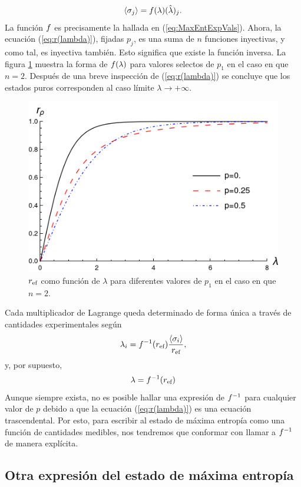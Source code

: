 \begin{equation}
    \expval{\sigma_{j}}=f(\lambda)(\hat{\lambda})_{j}.
\end{equation}
La función $f$ es precisamente la hallada en (\ref{eq:MaxEntExpVals}). Ahora, la ecuación (\ref{eq:r(lambda)}), fijadas $p_{j}$, es una suma de $n$ funciones inyectivas, y como tal, es inyectiva también. Esto significa que existe la función inversa. La figura \ref{fig:r(lambda)} muestra la forma de $f(\lambda)$ para valores selectos de $p_{1}$ en el caso en que $n=2$. Después de una breve inspección de (\ref{eq:r(lambda)}) se concluye que los estados puros corresponden al caso límite $\lambda\rightarrow+\infty$.

\begin{figure}[ht]
    \centering
    \includegraphics[width=0.6\linewidth]{chapter2/figures/r(lambda).png}
    \caption{$r_{\text{ef}}$ como función de $\lambda$ para diferentes valores de $p_{1}$ en el caso en que $n=2$.}
    \label{fig:r(lambda)}
\end{figure}
Cada multiplicador de Lagrange queda determinado de forma única a través de cantidades experimentales según 
\begin{equation}
    \lambda_{i}=f^{-1}(r_{\text{ef}}) \frac{\expval{\sigma_{i}}}{r_{\text{ef}}},
\end{equation}
y, por supuesto,
\begin{equation}
    \lambda=f^{-1}(r_{\text{ef}})\nonumber
\end{equation}
Aunque siempre exista, no es posible hallar una expresión de $f^{-1}$ para cualquier valor de $p$ debido a que la ecuación (\ref{eq:r(lambda)}) es una ecuación trascendental. Por esto, para escribir al estado de máxima entropía como una función de cantidades medibles, nos tendremos que conformar con llamar a $f^{-1}$ de manera explícita.

\subsection{Otra expresión del estado de máxima entropía}

